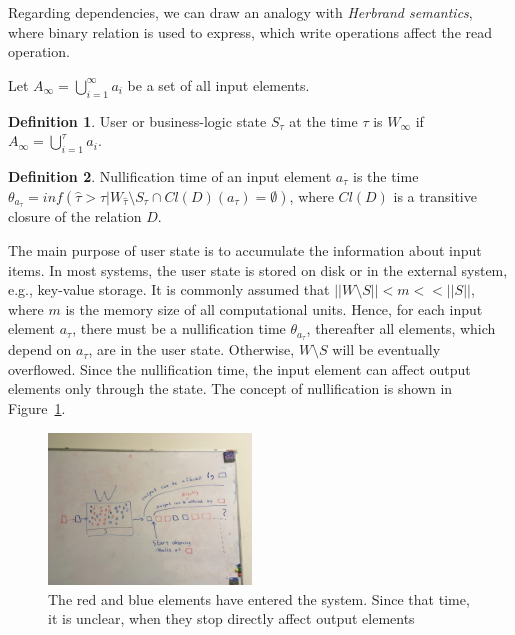 \documentclass[sigconf]{acmart}
\theoremstyle{definition}
\newtheorem{definition}{Definition}
\begin{document}
Regarding dependencies, we can draw an analogy with {\em Herbrand semantics}, where binary relation is used to express, which write operations affect the read operation.

Let $A_{\infty}=\bigcup\limits_{i=1}^{\infty}{a_i}$ be a set of all input elements.

\begin{definition}{User or business-logic state}
$S_\tau$ at the time $\tau$ is $W_{\infty}$ if $A_{\infty}=\bigcup\limits_{i=1}^{\tau}{a_i}$.
\end{definition}

\begin{definition}{Nullification time}
of an input element $a_\tau$ is the time $\theta_{a_\tau}=inf(\hat{\tau}>\tau|W_{\hat{\tau}}\setminus{S_{\hat{\tau}}}\cap{Cl(D)(a_\tau)=\emptyset})$, where $Cl(D)$ is a transitive closure of the relation $D$.
\end{definition}

The main purpose of user state is to accumulate the information about input items. In most systems, the user state is stored on disk or in the external system, e.g., key-value storage. It is commonly assumed that $||{W}\setminus{S}||<m<<||S||$, where $m$ is the memory size of all computational units. Hence, for each input element $a_\tau$, there must be a nullification time $\theta_{a_\tau}$, thereafter all elements, which depend on $a_\tau$, are in the user state. Otherwise, $W\setminus{S}$ will be eventually overflowed. Since the nullification time, the input element can affect output elements only through the state. The concept of nullification is shown in Figure~\ref{nullification}.   

\begin{figure}[htbp]
  \centering
  \includegraphics[width=0.48\textwidth]{pics/nullification}
  \caption{The red and blue elements have entered the system. Since that time, it is unclear, when they stop directly affect output elements}
  \label {nullification}
\end{figure}
\end{document}
